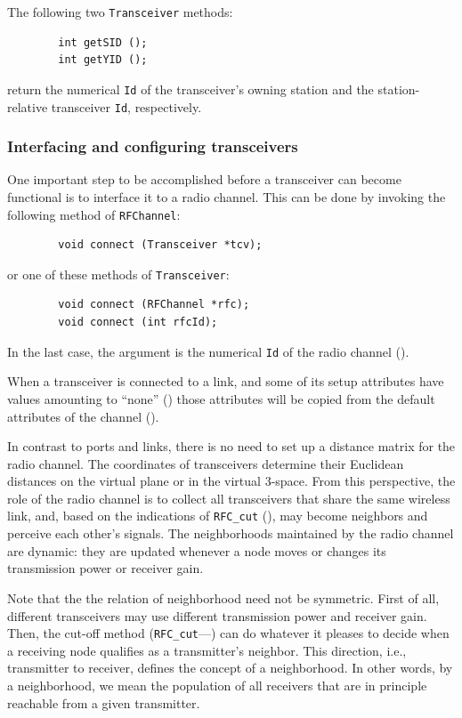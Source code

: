 The following two {\tt Transceiver} methods:
\begin{verbatim}
        int getSID ();
        int getYID ();
\end{verbatim}
return the numerical {\tt Id} of the transceiver's owning station and the
station-relative transceiver {\tt Id}, respectively.

\subsubsection{Interfacing and configuring transceivers}
\label{rm_to_tr_if}

One important step to be accomplished before a transceiver can become
functional is to interface it to a radio channel.
This can be done by invoking the following method of {\tt RFChannel}:
\begin{verbatim}
        void connect (Transceiver *tcv);
\end{verbatim}
\noindent
or one of these methods of {\tt Transceiver}:
\begin{verbatim}
        void connect (RFChannel *rfc);
        void connect (int rfcId);
\end{verbatim}
\noindent
In the last case, the argument is the numerical {\tt Id} of the radio channel
().

When a transceiver is connected to a link, and some of its setup attributes
have values amounting to ``none''
() 
those attributes will be copied from the default attributes of the
channel ().

In contrast to ports and links, there is no need to set up a distance matrix
for the radio channel.
The coordinates of transceivers determine their Euclidean distances on the
virtual plane or in the virtual 3-space.
From this perspective, the role of the radio channel is to collect
all transceivers that share the same wireless link, and, based
on the indications of {\tt RFC\_cut} (), may become
neighbors and perceive each other's signals.
The neighborhoods maintained by the radio channel are dynamic: they are updated
whenever a node moves or changes its transmission power or receiver
gain.

Note that the the relation of neighborhood need not be symmetric.
First of all, different transceivers may use different transmission power
and receiver gain.
Then, the cut-off method ({\tt RFC\_cut}---) can do whatever
it pleases to decide when a receiving node qualifies as a transmitter's
neighbor.
This direction, i.e., transmitter to receiver, defines the concept
of a neighborhood.
In other words, by a neighborhood, we mean the population of all receivers
that are in principle reachable from a given transmitter.

